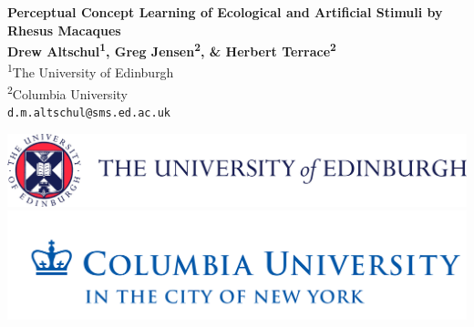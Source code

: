 \documentclass[a0,portrait]{a0poster}
\begin{document}


\begin{minipage}[b]{0.70\linewidth}
\veryHuge \color{NavyBlue} \textbf{Perceptual Concept Learning of Ecological and Artificial Stimuli by Rhesus Macaques} \color{Black}\\ %
\huge \textbf{Drew Altschul\textsuperscript{1}, Greg Jensen\textsuperscript{2}, \& Herbert Terrace\textsuperscript{2}}\\[0.5cm] %
\huge \textsuperscript{1}The University of Edinburgh\\[0.4cm] %
\huge \textsuperscript{2}Columbia University\\[0.4cm] %
\Large \texttt{d.m.altschul@sms.ed.ac.uk}\\
\end{minipage}
%
\begin{minipage}[b]{0.30\linewidth}
\includegraphics[width=26cm]{EdiU.jpg}\\
\includegraphics[width=22.1cm]{columbia2.png}\\
\end{minipage}




\end{document}
